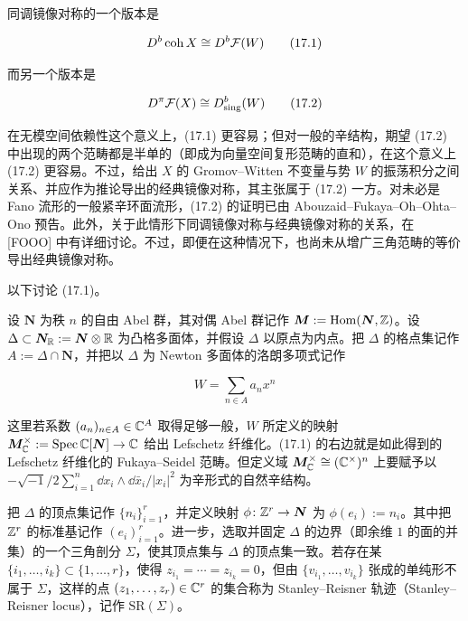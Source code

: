 同调镜像对称的一个版本是

\begin{equation}
  D^b\operatorname{coh}X \cong D^b\mathcal{F}(W) \tag{17.1}
\end{equation}

而另一个版本是

\begin{equation}
  D^{\pi}\mathcal{F}(X) \cong D^b_{\mathrm{sing}}(W) \tag{17.2}
\end{equation}

在无模空间依赖性这个意义上，(17.1) 更容易；但对一般的辛结构，期望 (17.2) 中出现的两个范畴都是半单的（即成为向量空间复形范畴的直和），在这个意义上 (17.2) 更容易。不过，给出 $X$ 的 Gromov–Witten 不变量与势 $W$ 的振荡积分之间关系、并应作为推论导出的经典镜像对称，其主张属于 (17.2) 一方。对未必是 Fano 流形的一般紧辛环面流形，(17.2) 的证明已由 Abouzaid–Fukaya–Oh–Ohta–Ono 预告。此外，关于此情形下同调镜像对称与经典镜像对称的关系，在 [FOOO] 中有详细讨论。不过，即便在这种情况下，也尚未从增广三角范畴的等价导出经典镜像对称。

以下讨论 (17.1)。

设 $\bm{N}$ 为秩 $n$ 的自由 Abel 群，其对偶 Abel 群记作 $\bm{M} := \operatorname{Hom}(\bm{N},\mathbb{Z})$。设 $\Delta\subset\bm{N}_{\mathbb{R}} := \bm{N}\otimes\mathbb{R}$ 为凸格多面体，并假设 $\Delta$ 以原点为内点。把 $\Delta$ 的格点集记作 $A := \Delta\cap\bm{N}$，并把以 $\Delta$ 为 Newton 多面体的洛朗多项式记作

\begin{equation}
  W = \sum_{n\in A}a_n x^n \tag{17.3}
\end{equation}

这里若系数 $(a_n)_{n\in A}\in\mathbb{C}^A$ 取得足够一般，$W$ 所定义的映射 $\bm{M}^{\times}_{\mathbb{C}} := \operatorname{Spec}\mathbb{C}[\bm{N}]\to\mathbb{C}$ 给出 Lefschetz 纤维化。(17.1) 的右边就是如此得到的 Lefschetz 纤维化的 Fukaya–Seidel 范畴。但定义域 $\bm{M}^{\times}_{\mathbb{C}}\cong(\mathbb{C}^{\times})^n$ 上要赋予以 $-\sqrt{-1}/2\sum_{i=1}^n \dd x_i\wedge \dd\bar{x}_i/|x_i|^2$ 为辛形式的自然辛结构。

把 $\Delta$ 的顶点集记作 $\{n_i\}_{i=1}^r$，并定义映射 $\phi\colon\mathbb{Z}^r\to\bm{N}$ 为 $\phi(e_i) := n_i$。其中把 $\mathbb{Z}^r$ 的标准基记作 $(e_i)_{i=1}^r$。进一步，选取并固定 $\Delta$ 的边界（即余维 $1$ 的面的并集）的一个三角剖分 $\Sigma$，使其顶点集与 $\Delta$ 的顶点集一致。若存在某 $\{i_1,\dots,i_k\}\subset\{1,\dots,r\}$，使得 $z_{i_1}=\cdots=z_{i_k}=0$，但由 $\{v_{i_1},\dots,v_{i_k}\}$ 张成的单纯形不属于 $\Sigma$，这样的点 $(z_1,\dots,z_r)\in\mathbb{C}^r$ 的集合称为 Stanley–Reisner 轨迹（Stanley–Reisner locus），记作 $\mathrm{SR}(\Sigma)$。

